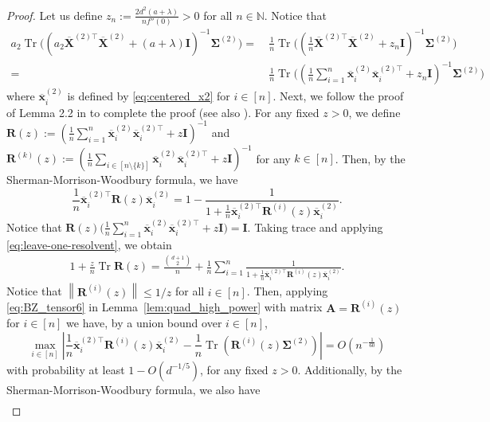 \documentclass[twoside,11pt]{article}
\newcommand{\norm}[1]{\left\|#1\right\|}
\newcommand{\N}{\mathbb{N}}
\def\bI{{\mathbf I}}
\def\bA{{\boldsymbol A}}
\def\bR{{\boldsymbol R}}
\def\bX{{\boldsymbol X}}
\def\bx{{\boldsymbol x}}
\def\bSigma{{\boldsymbol \Sigma}}
\newcommand{\Tr}{\operatorname{Tr}}
\newcommand{\1}{\mathbf{1}}
\begin{document}
\begin{proof} 
Let us define $z_n:=\frac{2d^2(a+\lambda)}{n f''(0)}>0$ for all $n\in\N$. Notice that 
\begin{align}
    a_2\Tr\big((a_2\overline{\bX}^{(2)\top}\overline{\bX}^{(2)}+(a+\lambda)\bI)^{-1}\bSigma^{(2)}\big) = ~&\frac{1}{n}\Tr\big((\frac{1}{n}\overline{\bX}^{(2)\top}\overline{\bX}^{(2)}+z_n\bI)^{-1}\bSigma^{(2)}\big)\\
    = ~&\frac{1}{n}\Tr\big((\frac{1}{n}\sum_{i=1}^n\overline\bx_i^{(2)}\overline\bx_i^{(2)\top}+z_n\bI)^{-1}\bSigma^{(2)}\big)
\end{align}
where $\overline\bx_i^{(2)}$ is defined by \eqref{eq:centered_x2} for $i\in[n]$. Next, we follow the proof of Lemma 2.2 in \citep{ledoit2011eigenvectors} to complete the proof (see also \citep[Theorem 10]{wang2024nonlinear}).
For any fixed $z>0$, we define $\bR(z):=(\frac{1}{n}\sum_{i=1}^n\overline\bx_i^{(2)}\overline\bx_i^{(2)\top}+z\bI)^{-1}$ and $\bR^{(k)}(z):=(\frac{1}{n}\sum_{i\in[n\setminus \{k\}]}\overline\bx_i^{(2)}\overline\bx_i^{(2)\top}+z\bI)^{-1}$ for any $k\in [n]$. Then, by the Sherman-Morrison-Woodbury formula, we have
\begin{equation}\label{eq:leave-one-resolvent}
    \frac{1}{n}\overline\bx_i^{(2)\top}\bR(z)\overline\bx_i^{(2)}=1-
    \frac{1}{1+\frac{1}{n}\overline\bx_i^{(2)\top}\bR^{(i)}(z)\overline\bx_i^{(2)}}.
\end{equation}
Notice that
$\bR(z)\Big(\frac{1}{n}\sum_{i=1}^n\overline\bx_i^{(2)}\overline\bx_i^{(2)\top}+z\bI\Big)=\bI$.
Taking trace and applying \eqref{eq:leave-one-resolvent}, we  obtain
\begin{align}\label{eq:identity}
    1+\frac{z}{n}\Tr \bR(z) = \frac{\binom{d+1}{2}}{n}+\frac{1}{n}\sum_{i=1}^n \frac{1}{1+\frac{1}{n}\overline\bx_i^{(2)\top}\bR^{(i)}(z)\overline\bx_i^{(2)}}.
\end{align}
Notice that $\norm{\bR^{(i)}(z)}\le 1/z$ for all $i\in [n]$. Then, applying \eqref{eq:BZ_tensor6} in  Lemma~\ref{lem:quad_high_power} with matrix $\bA=\bR^{(i)}(z)$ for $i\in [n]$ we have, by a union bound over $i\in [n]$,
\begin{equation}\label{eq:quad_uniform}
    \max_{i\in[n]}\left|\frac{1}{n}\overline\bx_i^{(2)\top}\bR^{(i)}(z)\overline{\bx}_i^{(2)}-\frac{1}{n}\Tr(\bR^{(i)}(z)\bSigma^{(2)})\right|=O(n^{-\frac{1}{60}})
\end{equation}
with probability at least $1-O(d^{-1/5})$, for any fixed $z>0$. Additionally, by the Sherman-Morrison-Woodbury formula, we also have
\begin{align}\label{eq:R_i-R}

\end{align}
\end{proof}
\end{document}
